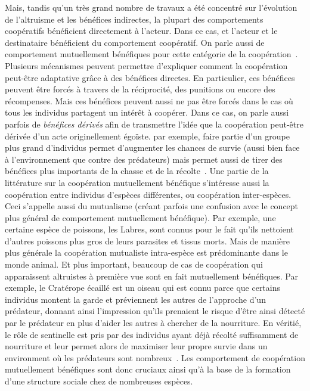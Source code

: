 		Mais, tandis qu'un très grand nombre de travaux a été concentré sur l'évolution de l'altruisme et les bénéfices indirectes, la plupart des comportements coopératifs bénéficient directement à l'acteur. Dans ce cas, et l'acteur et le destinataire bénéficient du comportement coopératif. On parle aussi de comportement mutuellement bénéfiques pour cette catégorie de la coopération~\parencite{Bergmuller2007a}. Plusieurs mécanismes peuvent permettre d'expliquer comment la coopération peut-être adaptative grâce à des bénéfices directes. En particulier, ces bénéfices peuvent être forcés à travers de la réciprocité, des punitions ou encore des récompenses. Mais ces bénéfices peuvent aussi ne pas être forcés dans le cas où tous les individus partagent un intérêt à coopérer. Dans ce cas, on parle aussi parfois de \emph{bénéfices dérivés} afin de transmettre l'idée que la coopération peut-être dérivée d'un acte originellement égoïste. par exemple, faire partie d'un groupe plus grand d'individus permet d'augmenter les chances de survie (aussi bien face à l'environnement que contre des prédateurs) mais permet aussi de tirer des bénéfices plus importants de la chasse et de la récolte~\parencite{Clutton-Brock2002}. Une partie de la littérature sur la coopération mutuellement bénéfique s'intéresse aussi la coopération entre individus d'espèces différentes, ou coopération inter-espèces. Ceci s'appelle aussi du mutualisme (créant parfois une confusion avec le concept plus général de comportement mutuellement bénéfique). Par exemple, une certaine espèce de poissons, les Labres, sont connus pour le fait qu'ils nettoient d'autres poissons plus gros de leurs parasites et tissus morts. Mais de manière plus générale la coopération mutualiste intra-espèce est prédominante dans le monde animal. Et plus important, beaucoup de cas de coopération qui apparaissent altruistes à première vue sont en fait mutuellement bénéfiques. Par exemple, le Cratérope écaillé est un oiseau qui est connu parce que certains individus montent la garde et préviennent les autres de l'approche d'un prédateur, donnant ainsi l'impression qu'ils prenaient le risque d'être ainsi détecté par le prédateur en plus d'aider les autres à chercher de la nourriture. En véritié, le rôle de sentinelle est pris par des individus ayant déjà récolté suffisamment de nourriture et leur permet alors de maximiser leur propre survie dans un environment où les prédateurs sont nombreux~\parencite{Wright2001, Clutton-Brock2002}. Les comportement de coopération mutuellement bénéfiques sont donc cruciaux ainsi qu'à la base de la formation d'une structure sociale chez de nombreuses espèces.

